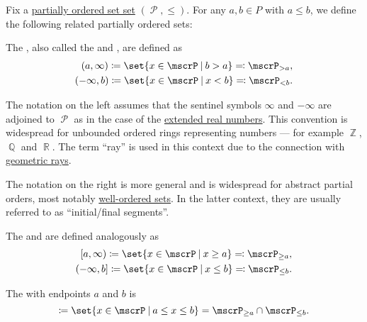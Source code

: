 \begin{definition}\label{def:partially_ordered_set_interval}
  Fix a \hyperref[def:partially_ordered_set]{partially ordered set set} \( (\mscrP, \leq) \). For any \( a, b \in P \) with \( a \leq b \), we define the following related partially ordered sets:

  \begin{thmenum}
     The , also called the  and , are defined as
    \begin{equation*}
      \begin{aligned}
        (a, \infty) \coloneqq \set{ x \in \mscrP \given b > a } \eqqcolon \mscrP_{>a},
        \\
        (-\infty, b) \coloneqq \set{ x \in \mscrP \given x < b } \eqqcolon \mscrP_{<b}.
      \end{aligned}
    \end{equation*}

    The notation on the left assumes that the sentinel symbols \( \infty \) and \( -\infty \) are adjoined to \( \mscrP \) as in the case of the \hyperref[def:extended_real_numbers]{extended real numbers}. This convention is widespread for unbounded ordered rings representing numbers --- for example \hyperref[def:integers]{\( \BbbZ \)}, \hyperref[def:rational_numbers]{\( \BbbQ \)} and \hyperref[def:set_of_real_numbers]{\( \BbbR \)}. The term \enquote{ray} is used in this context due to the connection with \hyperref[def:geometric_ray]{geometric rays}.

    The notation on the right is more general and is widespread for abstract partial orders, most notably \hyperref[def:well_ordered_set]{well-ordered sets}. In the latter context, they are usually referred to as \enquote{initial/final segments}.

    The  and  are defined analogously as
    \begin{equation*}
      \begin{aligned}
        [a, \infty) \coloneqq \set{ x \in \mscrP \given x \geq a } \eqqcolon \mscrP_{\geq a},
        \\
        (-\infty, b] \coloneqq \set{ x \in \mscrP \given x \leq b } \eqqcolon \mscrP_{\leq b}.
      \end{aligned}
    \end{equation*}

     The  with endpoints \( a \) and \( b \) is
    \begin{equation*}
      [a, b] \coloneqq \set{ x \in \mscrP \given a \leq x \leq b } = \mscrP_{\geq a} \cap \mscrP_{\leq b}.
    \end{equation*}


\end{thmenum}
\end{definition}
